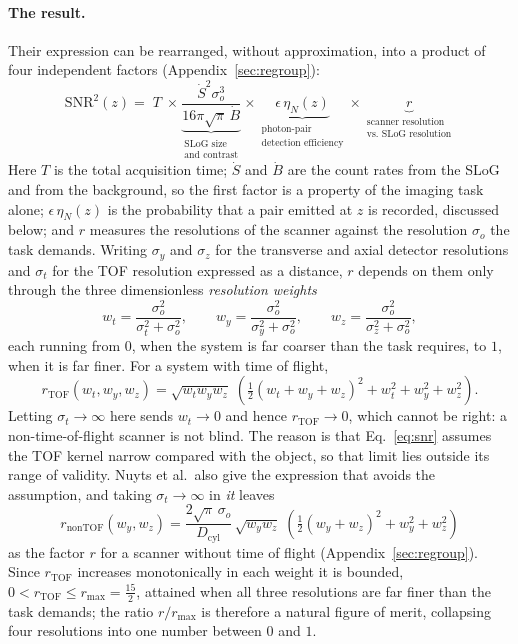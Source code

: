 \documentclass[11pt,a4paper]{article}
\newcommand{\Dcyl}{D_{\mathrm{cyl}}}
\newcommand{\rT}{r_{\mathrm{TOF}}}
\newcommand{\rN}{r_{\mathrm{nonTOF}}}
\newcommand{\so}{\sigma_{\!o}}
\begin{document}
\paragraph{The result.}
Their expression can be rearranged, without approximation, into a product of four
independent factors (Appendix~\ref{sec:regroup}):
\begin{equation}
  \boxed{\;
  \mathrm{SNR}^{2}(z)=\;T\;\times
  \underbrace{\frac{\dot S^{2}\so^{3}}{16\pi\sqrt{\pi}\,\dot B}}
             _{\substack{\text{SLoG size}\\[1pt]\text{and contrast}}}
  \times
  \underbrace{\epsilon\,\eta_N(z)}
             _{\substack{\text{photon-pair}\\[1pt]\text{detection efficiency}}}
  \times
  \underbrace{r}
             _{\substack{\text{scanner resolution}\\[1pt]\text{vs.\ SLoG resolution}}} \;}
  \label{eq:grouped}
\end{equation}
Here $T$ is the total acquisition time; $\dot S$ and $\dot B$ are the count rates from the
SLoG and from the background, so the first factor is a property of the imaging task alone;
$\epsilon\,\eta_N(z)$ is the probability that a pair emitted at $z$ is recorded, discussed
below; and $r$ measures the resolutions of the scanner against the resolution $\so$ the task
demands. Writing $\sigma_y$ and $\sigma_z$ for the transverse and axial detector resolutions
and $\sigma_t$ for the TOF resolution expressed as a distance, $r$ depends on them only
through the three dimensionless \emph{resolution weights}
\begin{equation}
  w_t=\frac{\so^{2}}{\sigma_t^{2}+\so^{2}},\qquad
  w_y=\frac{\so^{2}}{\sigma_y^{2}+\so^{2}},\qquad
  w_z=\frac{\so^{2}}{\sigma_z^{2}+\so^{2}},
  \label{eq:weights}
\end{equation}
each running from $0$, when the system is far coarser than the task requires, to $1$, when
it is far finer. For a system with time of flight,
\begin{equation}
  \boxed{\;
  \rT(w_t,w_y,w_z)=\sqrt{w_t w_y w_z}\;
  \left(\tfrac{1}{2}\left(w_t+w_y+w_z\right)^{2}+w_t^{2}+w_y^{2}+w_z^{2}\right).\;}
  \label{eq:Fres}
\end{equation}
Letting $\sigma_t\to\infty$ here sends $w_t\to0$ and hence $\rT\to0$, which cannot be right:
a non-time-of-flight scanner is not blind. The reason is that Eq.~\eqref{eq:snr} assumes the
TOF kernel narrow compared with the object, so that limit lies outside its range of
validity. Nuyts et al.\ also give the expression that avoids the assumption, and taking
$\sigma_t\to\infty$ in \emph{it} leaves
\begin{equation}
  \boxed{\;
  \rN(w_y,w_z)=\frac{2\sqrt{\pi}\,\so}{\Dcyl}\,
  \sqrt{w_y w_z}\;\left(\tfrac{1}{2}\left(w_y+w_z\right)^{2}+w_y^{2}+w_z^{2}\right)\;}
  \label{eq:FnoTOF}
\end{equation}
as the factor $r$ for a scanner without time of flight (Appendix~\ref{sec:regroup}). Since
$\rT$ increases monotonically in each weight it is bounded, $0<\rT\le r_{\max}=\tfrac{15}{2}$,
attained when all three resolutions are far finer than the task demands; the ratio
$r/r_{\max}$ is therefore a natural figure of merit, collapsing four resolutions into one
number between $0$ and $1$.
\end{document}
